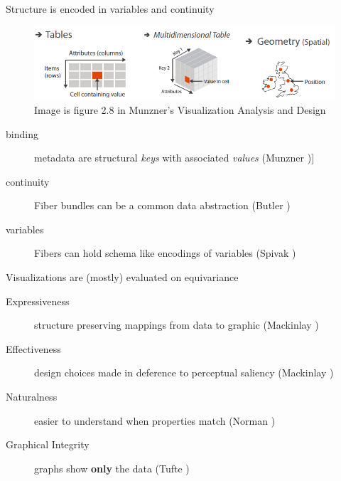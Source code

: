 \documentclass[xcolor={dvipsnames}, handout]{beamer}
\begin{document}
\begin{frame}{Structure is encoded in variables and continuity}
    \begin{figure}
        \includegraphics[width=1\textwidth]{figures/intro/munzner_datatypes.png}
        \caption{Image is figure 2.8 in Munzner's Visualization Analysis and Design\cite{munznerVisualizationAnalysisDesign2014}}
    \end{figure}
    \begin{description}
        \item[binding] metadata are structural \textit{keys} with associated \textit{values} (Munzner \cite{munznerVisualizationAnalysisDesign2014})] 
        \item[continuity] Fiber bundles can be a common data abstraction (Butler \cite{butlerVectorBundleClassesForm1992,butlerVisualizationModelBased1989})
        \item[variables] Fibers can hold schema like encodings of variables (Spivak \cite{spivakDatabasesAreCategories2010,spivakSIMPLICIALDATABASES})
    \end{description}
\end{frame}

\begin{frame}{Visualizations are (mostly) evaluated on equivariance}
    \begin{description}
        \item[Expressiveness] structure preserving mappings from data to graphic (Mackinlay \cite{mackinlayAutomatingDesignGraphical1986})
        \item[Effectiveness] design choices made in deference to perceptual saliency (Mackinlay \cite{clevelandResearchStatisticalGraphics1987,clevelandGraphicalPerceptionTheory1984,chambersGraphicalMethodsData1983a, munznerVisualizationAnalysisDesign2014})
        \item[Naturalness] easier to understand when properties match (Norman \cite{norman_things_smart})
        \item[Graphical Integrity] graphs show \textbf{only} the data (Tufte \cite{tufteVisualDisplayQuantitative2001})
    \end{description}
\end{frame}
\end{document}

